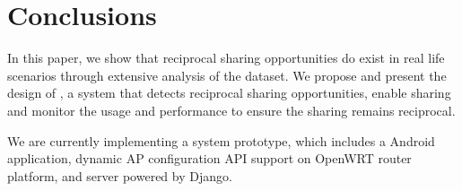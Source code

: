 \section{Conclusions}
\label{sec:conclusion}

In this paper, we show that reciprocal \wifi{} sharing opportunities do exist in real
life scenarios through extensive analysis of the \PhoneLab{} \wifi{} dataset. We
propose and present the design of \wisefi{}, a system that detects reciprocal
sharing opportunities, enable \wifi{} sharing and monitor the \wifi{} usage and
performance to ensure the sharing remains reciprocal.

We are currently implementing a \wisefi{} system prototype, which includes a
\wisefi{} Android application, dynamic AP configuration API support on OpenWRT
router platform, and \wisefi{} server powered by Django.
